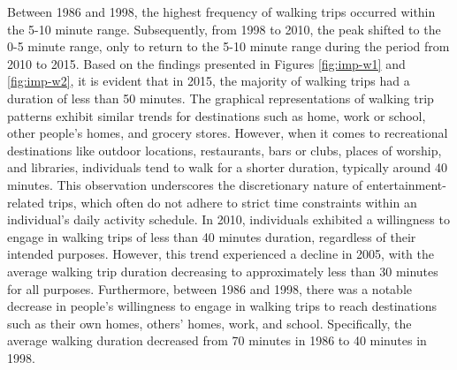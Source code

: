 \documentclass[12pt,twoside]{reedthesis}
\begin{document}
Between 1986 and 1998, the highest frequency of walking trips occurred within the 5-10 minute range. Subsequently, from 1998 to 2010, the peak shifted to the 0-5 minute range, only to return to the 5-10 minute range during the period from 2010 to 2015. Based on the findings presented in Figures \ref{fig:imp-w1} and \ref{fig:imp-w2}, it is evident that in 2015, the majority of walking trips had a duration of less than 50 minutes. The graphical representations of walking trip patterns exhibit similar trends for destinations such as home, work or school, other people's homes, and grocery stores. However, when it comes to recreational destinations like outdoor locations, restaurants, bars or clubs, places of worship, and libraries, individuals tend to walk for a shorter duration, typically around
40 minutes. This observation underscores the discretionary nature of entertainment-related trips, which often do not adhere to strict time constraints within an individual's daily activity schedule. In 2010, individuals exhibited a willingness to engage in walking trips of less than 40 minutes duration, regardless of their intended purposes. However, this trend experienced a decline in 2005, with the average walking trip duration decreasing to approximately less than 30 minutes for all purposes. Furthermore, between 1986 and 1998, there was a notable decrease in people's willingness to engage
in walking trips to reach destinations such as their own homes, others' homes, work, and school. Specifically, the average walking duration decreased from 70 minutes in 1986 to 40 minutes in 1998.
\end{document}
